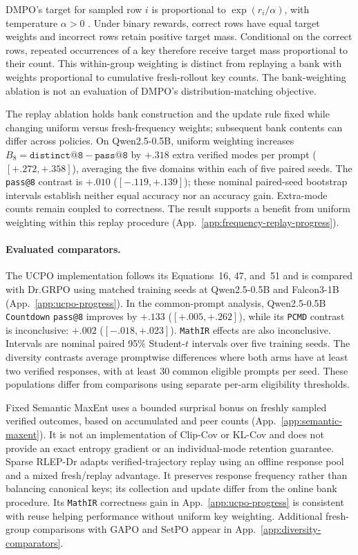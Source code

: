 \documentclass{article}
\newcommand{\1}{\mathbf 1}
\newcommand{\pmd}{\texttt{PCMD}}
\theoremstyle{remark}
\theoremstyle{definition}
\theoremstyle{plain}
\begin{document}
DMPO's target for sampled row $i$ is proportional to
$\exp(r_i/\alpha)$, with temperature $\alpha>0$
\citep[Eq.~5]{li2026distribution}. Under binary rewards, correct rows have
equal target weights and incorrect rows retain positive target mass.
Conditional on the correct rows, repeated occurrences of a key therefore
receive target mass proportional to their count. This within-group
weighting is distinct from replaying a bank with weights proportional to
cumulative fresh-rollout key counts. The bank-weighting ablation is not an
evaluation of DMPO's distribution-matching objective.

The replay ablation holds bank construction and the update rule fixed while
changing uniform versus fresh-frequency weights; subsequent bank contents
can differ across policies. On Qwen2.5-0.5B, uniform weighting increases
$B_8=\texttt{distinct@8}-\texttt{pass@8}$ by $+.318$ extra verified modes
per prompt ($[+.272,+.358]$), averaging the five domains within each of five
paired seeds. The \texttt{pass@8} contrast is $+.010$ ($[-.119,+.139]$);
these nominal paired-seed bootstrap intervals establish neither equal
accuracy nor an accuracy gain. Extra-mode counts remain coupled to
correctness. The result supports a benefit from uniform weighting within
this replay procedure (App.~\ref{app:frequency-replay-progress}).

\paragraph{Evaluated comparators.}
The UCPO implementation follows its Equations~16, 47, and~51 and is compared
with Dr.GRPO using matched training seeds at Qwen2.5-0.5B and Falcon3-1B
(App.~\ref{app:ucpo-progress}). In the common-prompt analysis, Qwen2.5-0.5B
\texttt{Countdown} \texttt{pass@8} improves by $+.133$ ($[+.005,+.262]$), while its
\pmd{} contrast is inconclusive: $+.002$ ($[-.018,+.023]$). \texttt{MathIR} effects
are also inconclusive. Intervals are nominal paired 95\% Student-$t$
intervals over five training seeds. The diversity contrasts average promptwise
differences where both arms have at least two verified responses, with at
least 30 common eligible prompts per seed. These populations differ from
comparisons using separate per-arm eligibility thresholds.

Fixed Semantic MaxEnt uses a bounded surprisal bonus on freshly sampled
verified outcomes, based on accumulated and peer counts
(App.~\ref{app:semantic-maxent}). It is not an implementation of Clip-Cov
or KL-Cov and does not provide an exact entropy gradient or an individual-mode
retention guarantee. Sparse RLEP-Dr adapts verified-trajectory replay
\citep{zhang2025rlep} using an offline response pool and a mixed fresh/replay
advantage. It preserves response frequency rather than balancing canonical
keys; its collection and update differ from the online bank procedure.
Its \texttt{MathIR} correctness gain in App.~\ref{app:ucpo-progress} is consistent
with reuse helping performance without uniform key weighting.
Additional fresh-group comparisons with GAPO and SetPO appear in
App.~\ref{app:diversity-comparators}.
\end{document}
